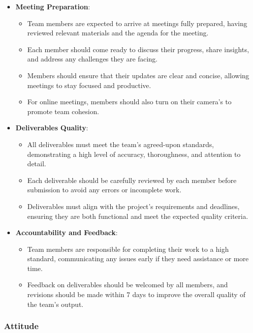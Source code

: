 \documentclass{article}
\begin{document}
\begin{itemize}
  \item \textbf{Meeting Preparation}:
    \begin{itemize}
      \item Team members are expected to arrive at meetings fully prepared, having reviewed relevant materials and the agenda for the meeting.
      \item Each member should come ready to discuss their progress, share insights, and address any challenges they are facing.
      \item Members should ensure that their updates are clear and concise, allowing meetings to stay focused and productive.
      \item For online meetings, members should also turn on their camera's to promote team cohesion.
    \end{itemize}

  \item \textbf{Deliverables Quality}:
    \begin{itemize}
      \item All deliverables must meet the team’s agreed-upon standards, demonstrating a high level of accuracy, thoroughness, and attention to detail.
      \item Each deliverable should be carefully reviewed by each member before submission to avoid any errors or incomplete work.
      \item Deliverables must align with the project's requirements and deadlines, ensuring they are both functional and meet the expected quality criteria.
    \end{itemize}

  \item \textbf{Accountability and Feedback}:
    \begin{itemize}
        \item Team members are responsible for completing their work to a high standard, communicating any issues early if they need assistance or more time.
        \item Feedback on deliverables should be welcomed by all members, and revisions should be made within 7 days to improve the overall quality of the team’s output.
    \end{itemize}

\end{itemize}

\subsubsection*{Attitude}
\end{document}
